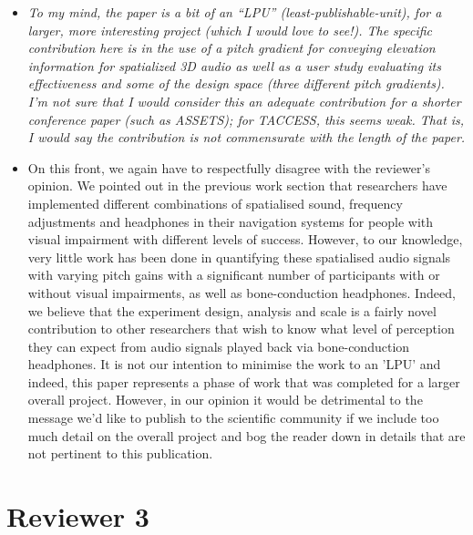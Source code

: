\documentclass{article}
\begin{document}
\begin{itemize}
  \item \textit{To my mind, the paper is a bit of an “LPU” (least-publishable-unit), for a larger, more interesting project (which I would love to see!). The specific contribution here is in the use of a pitch gradient for conveying elevation information for spatialized 3D audio as well as a user study evaluating its effectiveness and some of the design space (three different pitch gradients). I’m not sure that I would consider this an adequate contribution for a shorter conference paper (such as ASSETS); for TACCESS, this seems weak. That is, I would say the contribution is not commensurate with the length of the paper.}
  \item[] On this front, we again have to respectfully disagree with the reviewer's opinion.
    We pointed out in the previous work section that researchers have implemented different combinations of spatialised sound, frequency adjustments and headphones in their navigation systems for people with visual impairment with different levels of success.
    However, to our knowledge, very little work has been done in quantifying these spatialised audio signals with varying pitch gains with a significant number of participants with or without visual impairments, as well as bone-conduction headphones.
    Indeed, we believe that the experiment design, analysis and scale is a fairly novel contribution to other researchers that wish to know what level of perception they can expect from audio signals played back via bone-conduction headphones.
    It is not our intention to minimise the work to an 'LPU' and indeed, this paper represents a phase of work that was completed for a larger overall project.
    However, in our opinion it would be detrimental to the message we'd like to publish to the scientific community if we include too much detail on the overall project and bog the reader down in details that are not pertinent to this publication.

\end{itemize}

\section*{Reviewer 3}

\end{document}
